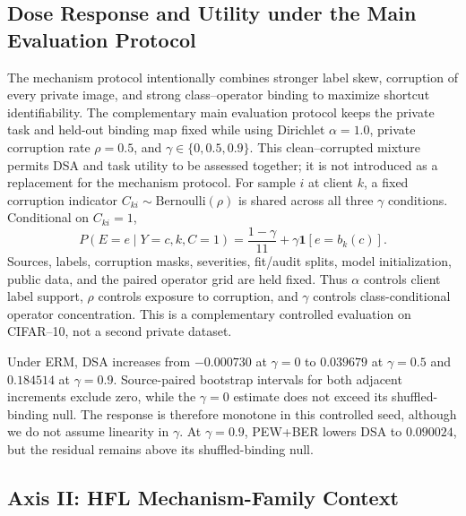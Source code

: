 
\subsection{Dose Response and Utility under the Main Evaluation Protocol}

The mechanism protocol intentionally combines stronger label skew, corruption of every private image, and strong class--operator binding to maximize shortcut identifiability. The complementary main evaluation protocol keeps the private task and held-out binding map fixed while using Dirichlet $\alpha=1.0$, private corruption rate $\rho=0.5$, and $\gamma\in\{0,0.5,0.9\}$. This clean--corrupted mixture permits DSA and task utility to be assessed together; it is not introduced as a replacement for the mechanism protocol. For sample $i$ at client $k$, a fixed corruption indicator $C_{ki}\sim\mathrm{Bernoulli}(\rho)$ is shared across all three $\gamma$ conditions. Conditional on $C_{ki}=1$,
\[
P(E=e\mid Y=c,k,C=1)=\frac{1-\gamma}{11}+\gamma\mathbf{1}[e=b_k(c)].
\]
Sources, labels, corruption masks, severities, fit/audit splits, model initialization, public data, and the paired operator grid are held fixed. Thus $\alpha$ controls client label support, $\rho$ controls exposure to corruption, and $\gamma$ controls class-conditional operator concentration. This is a complementary controlled evaluation on CIFAR--10, not a second private dataset.



Under ERM, DSA increases from \(-0.000730\) at \(\gamma=0\) to \(0.039679\) at \(\gamma=0.5\) and \(0.184514\) at \(\gamma=0.9\). Source-paired bootstrap intervals for both adjacent increments exclude zero, while the \(\gamma=0\) estimate does not exceed its shuffled-binding null. The response is therefore monotone in this controlled seed, although we do not assume linearity in \(\gamma\). At \(\gamma=0.9\), PEW+BER lowers DSA to \(0.090024\), but the residual remains above its shuffled-binding null.

\subsection{Axis II: HFL Mechanism-Family Context}

